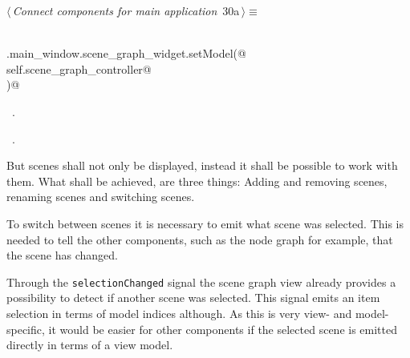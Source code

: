 \documentclass[
    a4paper,      %
    10pt,         %
    openright,    %
    notitlepage,  %
    parskip=half, %
]{scrreprt}       %
\theoremstyle{definition}                    %
\begin{document}
\begin{flushleft} \small
\begin{minipage}{\linewidth}\label{scrap29}\raggedright\small
{} $\langle\,${\itshape Connect components for main application}\nobreak\ {\footnotesize {30a}}$\,\rangle\equiv$
\vspace{-1ex}
\begin{list}{}{} \item
\mbox{}\lstinline@@\\
\mbox{}\lstinline@self.main_window.scene_graph_widget.setModel(@\\
\mbox{}\lstinline@    self.scene_graph_controller@\\
\mbox{}\lstinline@)@\\
\mbox{}\lstinline@@{\NWsep}
\end{list}
\vspace{-1.5ex}
\footnotesize
\begin{list}{}{\setlength{\itemsep}{-\parsep}\setlength{\itemindent}{-\leftmargin}}
\item \NWtxtMacroDefBy\ .
\item \NWtxtMacroRefIn\ .

\item{}
\end{list}
\end{minipage}\vspace{4ex}
\end{flushleft}
But scenes shall not only be displayed, instead it shall be possible to work
with them. What shall be achieved, are three things: Adding and removing scenes,
renaming scenes and switching scenes.

To switch between scenes it is necessary to emit what scene was selected. This
is needed to tell the other components, such as the node graph for example, that
the scene has changed.

Through the \verb+selectionChanged+ signal the scene graph view already provides
a possibility to detect if another scene was selected. This signal emits an item
selection in terms of model indices although. As this is very view- and
model-specific, it would be easier for other components if the selected scene is
emitted directly in terms of a view model.
\end{document}
